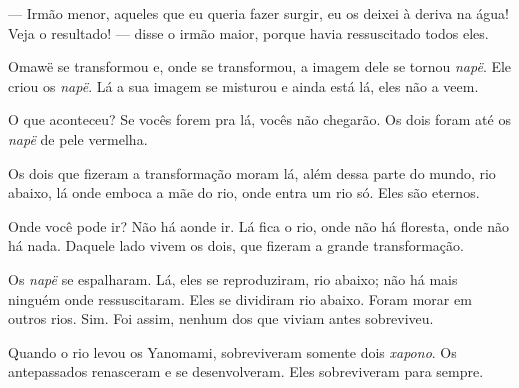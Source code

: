 --- Irmão menor, aqueles que eu queria fazer surgir, eu os
deixei à deriva na água! Veja o resultado! --- disse o irmão maior,
porque havia ressuscitado todos eles. 

Omawë se transformou e, onde se transformou, a imagem dele se
tornou \textit{napë}. Ele criou os \textit{napë}. Lá a sua imagem se misturou
e ainda está lá, eles não a veem. 



O que aconteceu? Se vocês forem pra lá, vocês não chegarão. Os dois
foram até os \textit{napë} de pele vermelha. 


Os dois que fizeram a transformação moram lá, além dessa parte do mundo,
rio abaixo, lá onde emboca a mãe do rio, onde entra um rio só. Eles são
eternos. 

Onde você pode ir? Não há aonde ir. Lá fica o rio, onde não há floresta,
onde não há nada. Daquele lado vivem os dois, que fizeram a grande
transformação. 

Os \textit{napë} se espalharam. Lá, eles se reproduziram, rio abaixo; não
há mais ninguém onde ressuscitaram. Eles se dividiram rio abaixo. Foram
morar em outros rios. Sim. Foi assim, nenhum dos que viviam
antes sobreviveu. 

Quando o rio levou os Yanomami, sobreviveram somente dois \textit{xapono}. Os
antepassados renasceram e se desenvolveram. Eles sobreviveram para
sempre. 



